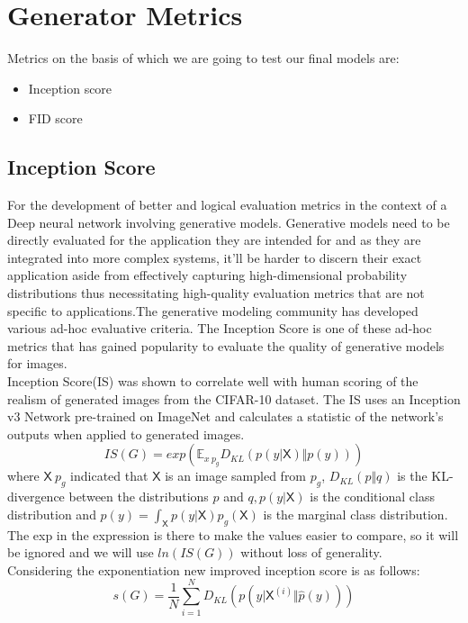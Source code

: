         \section{Generator Metrics}
            Metrics on the basis of which we are going to test our final models are: 
            \begin{itemize}
                \item Inception score
                \item FID score
            \end{itemize}
        
            \subsection{Inception Score}
                For the development of better and logical evaluation metrics in the context of a Deep neural network involving generative models. Generative models need to be directly evaluated for the application they are intended for and as they are integrated into more complex systems, it'll be harder to discern their exact application aside from effectively capturing high-dimensional probability distributions thus necessitating high-quality evaluation metrics that are not specific to applications.The generative modeling community has developed various ad-hoc evaluative criteria. The Inception Score is one of these ad-hoc metrics that has gained popularity to evaluate the quality of generative models for images. \\
                Inception Score(IS) was shown to correlate well with human scoring of the realism of generated images from the CIFAR-10 dataset. The IS uses an Inception v3 Network pre-trained on ImageNet and calculates a statistic of the network’s outputs when applied to generated images. \\
                    \begin{equation}
                        {IS(G) = exp(\mathbb{E}_{x~p_g}D_{KL}(p(y|\mathsf{X}) \Vert p(y)))}
                    \end{equation}    
                    where ${\mathsf{X} ~ p_g}$ indicated that ${\mathsf{X}}$ is an image sampled from ${p_g}$, ${D_{KL}(p \Vert q)}$ is the KL-divergence between the distributions ${p}$ and ${q, p(y|\mathsf{X})}$ is the conditional class distribution and ${p(y) = \int_{\mathsf{X}}^{}p(y|\mathsf{X})p_g(\mathsf{X})}$ is the marginal class distribution. The exp in the expression is there to make the values easier to compare, so it will be ignored and we will use ${ln(IS(G))}$ without loss of generality.\\
                Considering the exponentiation new improved inception score is as follows:
                    \begin{equation}
                        {s(G) = \frac{1}{N}\sum^{N}_{i=1} D_{KL}(p(y|\mathsf{X}^{(i)} \Vert \hat{p}(y)))}
                    \end{equation}
